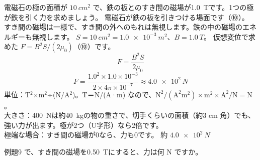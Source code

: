 \label{ph:電-8:ex9}
\begin{phreidai}[電磁石が鉄を引く力]
電磁石の極の面積が $\qty{10}{cm^2}$ で、鉄の板とのすき間の磁場が\qty{1.0}{T}です。1つの極が鉄を引く力を求めましょう。
\phbamen
電磁石が鉄の板を引きつける場面です（⑩）。
\phmushi
すき間の磁場は一様で、すき間の外へのもれは無視します。鉄の中の磁場のエネルギーも無視します。
\phzu
$S=\qty{10}{cm^2}=\qty{1.0e-3}{m^2}$、$B=\qty{1.0}{T}$。
\phriyu
仮想変位で求めた $F=B^2S/(2\mu_0)$（⑩）です。
\phtateru
\[ F=\frac{B^2S}{2\mu_0} \]
\phtoku
\[ F=\frac{1.0^2\times1.0\times10^{-3}}{2\times4\pi\times10^{-7}}\approx\qty{4.0e2}{N} \]
\phtashikame
単位：T$^2$×m$^2$÷(N/A$^2$)。T＝N/(A·m) なので、$\mathrm{N^2/(A^2m^2)}\times\mathrm{m^2}\times\mathrm{A^2/N}=\mathrm{N}$。\\
大きさ：\qty{400}{N}は約\qty{40}{kg}の物の重さで、切手くらいの面積（約3 cm 角）でも、強い力が出ます。極が2つ（U字形）なら2倍です。\\
極端な場合：すき間の磁場が0なら、力も0です。
\kotae 約 $\qty{4.0e2}{N}$
\end{phreidai}
\begin{jibun}
例題9 で、すき間の磁場を\qty{0.50}{T}にすると、力は何 N ですか。
\end{jibun}


